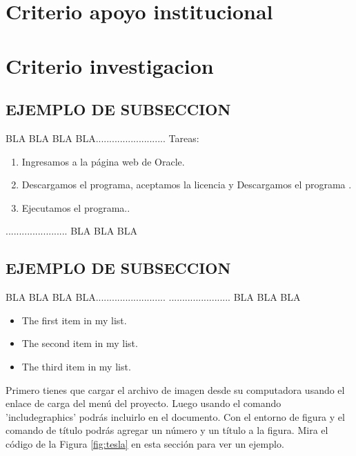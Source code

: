 \documentclass[12pt,a4paper]{report}
\begin{document}
\section{ Criterio apoyo institucional}

\section{ Criterio investigacion}

\subsection{EJEMPLO DE SUBSECCION}
BLA BLA BLA BLA..........................
Tareas:
\begin{enumerate}
    \item Ingresamos a la página web de Oracle.
    \item Descargamos el programa, aceptamos la licencia y Descargamos el programa .
    \item Ejecutamos el programa..
\end{enumerate}
....................... BLA BLA BLA
\subsection{EJEMPLO DE SUBSECCION}
BLA BLA BLA BLA..........................
....................... BLA BLA BLA
\begin{itemize}
\item The first item in my list. 
\item The second item in my list.
\item The third item in my list.
\end{itemize}
Primero tienes que cargar el archivo de imagen desde su computadora usando el enlace de carga del menú del proyecto. Luego usando el comando 'includegraphics' podrás incluirlo en el documento. Con el entorno de figura y el comando de título podrás agregar un número y un título a la figura. Mira el código de la Figura \ref{fig:tesla} en esta sección para ver un ejemplo.
\end{document}
